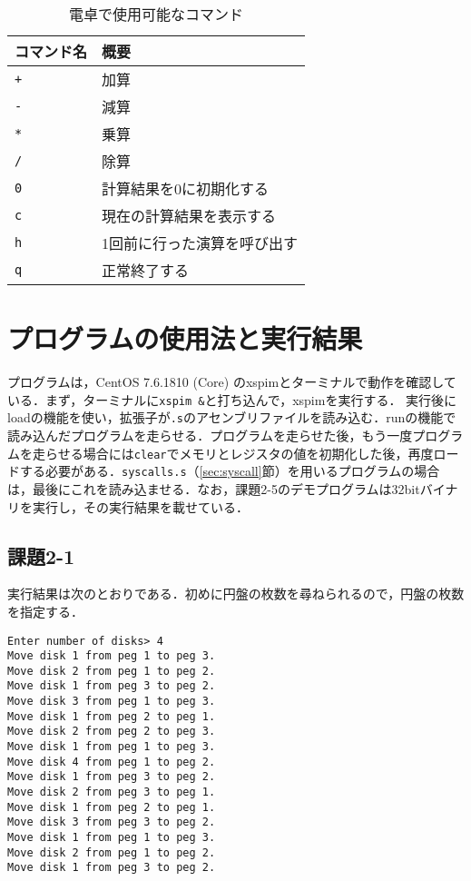 \begin{table}[b]
\centering
	\caption{電卓で使用可能なコマンド}
	\label{tab:commands}
    	\begin{tabular}{|l|l|}
	\hline
コマンド名&概要\\
	\hline
\verb|+|&加算\\
	\hline
\verb|-|&減算\\
	\hline
\verb|*|&乗算\\
	\hline
\verb|/|&除算\\
	\hline
\verb|0|&計算結果を0に初期化する\\
	\hline
\verb|c|&現在の計算結果を表示する\\
	\hline
\verb|h|&1回前に行った演算を呼び出す\\
	\hline
\verb|q|&正常終了する\\
	\hline

	\end{tabular}
\end{table}


\section{プログラムの使用法と実行結果}\label{sec:howresult}

プログラムは，CentOS 7.6.1810 (Core) のxspimとターミナルで動作を確認している．まず，ターミナルに\verb|xspim &|と打ち込んで，xspimを実行する．
実行後にloadの機能を使い，拡張子が\verb|.s|のアセンブリファイルを読み込む．runの機能で読み込んだプログラムを走らせる．プログラムを走らせた後，もう一度プログラムを走らせる場合には\verb|clear|でメモリとレジスタの値を初期化した後，再度ロードする必要がある．\verb|syscalls.s|（\ref{sec:syscall}節）を用いるプログラムの場合は，最後にこれを読み込ませる．なお，課題2-5のデモプログラムは32bitバイナリを実行し，その実行結果を載せている．

\subsection{課題2-1}
実行結果は次のとおりである．初めに円盤の枚数を尋ねられるので，円盤の枚数を指定する．

\begin{Verbatim}
Enter number of disks> 4
Move disk 1 from peg 1 to peg 3.
Move disk 2 from peg 1 to peg 2.
Move disk 1 from peg 3 to peg 2.
Move disk 3 from peg 1 to peg 3.
Move disk 1 from peg 2 to peg 1.
Move disk 2 from peg 2 to peg 3.
Move disk 1 from peg 1 to peg 3.
Move disk 4 from peg 1 to peg 2.
Move disk 1 from peg 3 to peg 2.
Move disk 2 from peg 3 to peg 1.
Move disk 1 from peg 2 to peg 1.
Move disk 3 from peg 3 to peg 2.
Move disk 1 from peg 1 to peg 3.
Move disk 2 from peg 1 to peg 2.
Move disk 1 from peg 3 to peg 2.
\end{Verbatim}

